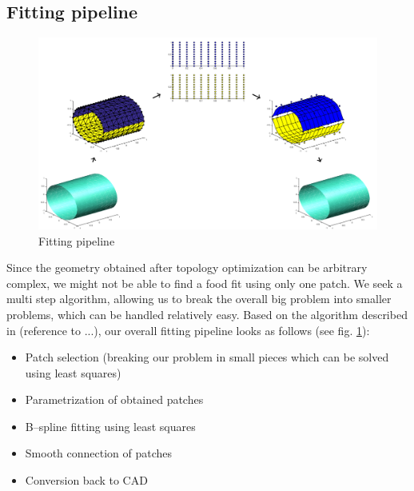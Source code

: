 \subsection{Fitting pipeline}
\begin{figure}
  \includegraphics[width=.85\linewidth]{Fitting_workflow.png}
  \caption{Fitting pipeline}
  \label{fig:fitting_pipeline}
\end{figure}
Since the geometry obtained after topology optimization can be arbitrary complex, we might not be able to find a food fit using only one patch. We seek a multi step algorithm, allowing us to break the overall big problem into smaller problems, which can be handled relatively easy.
Based on the algorithm described in (reference to ...), our overall fitting pipeline looks as follows (see fig. \ref{fig:fitting_pipeline}):
\begin{itemize}
	\item Patch selection (breaking our problem in small pieces which can be solved using least squares)
	\item Parametrization of obtained patches
	\item B--spline fitting using least squares
	\item Smooth connection of patches
	\item Conversion back to CAD
\end{itemize}
